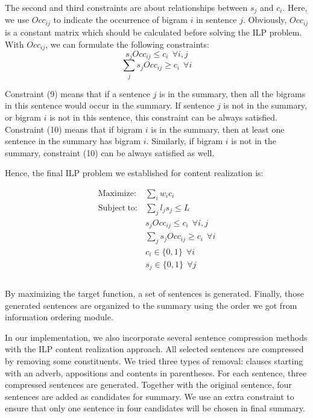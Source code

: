 \documentclass[11pt]{article}
\begin{document}
The second and third constraints are about relationships between $s_j$ and $c_i$. Here, we use $Occ_{ij}$ to indicate the occurrence of bigram $i$ in sentence $j$. Obviously, $Occ_{ij}$ is a constant matrix which should be calculated before solving the ILP problem. With $Occ_{ij}$, we can formulate the following constraints:
\begin{equation}
	s_jOcc_{ij} \leq c_i\ \  \forall i,j
\end{equation}
\begin{equation}
	\sum_j s_jOcc_{ij} \geq c_i\ \  \forall i
\end{equation}

Constraint (9) means that if a sentence $j$ is in the summary, then all the bigrams in this sentence would occur in the summary. If sentence $j$ is not in the summary, or bigram $i$ is not in this sentence, this constraint can be always satisfied. Constraint (10) means that if bigram $i$ is in the summary, then at least one sentence in the summary has bigram $i$. Similarly, if bigram $i$ is not in the summary, constraint (10) can be always satisfied as well.

Hence, the final ILP problem we established for content realization is:

\begin{equation}
	\begin{aligned}
	\mathrm{Maximize:} & \sum_i{w_ic_i} \\
	\mathrm{Subject\ to:} & \sum_j{l_js_j} \leq L \\
 	& s_jOcc_{ij} \leq c_i\ \ \forall i,j\\
	& \sum_j s_jOcc_{ij} \geq c_i\ \ \forall i \\
	& c_i \in \{0,1\}\ \ \forall i \\
	& s_j \in \{0,1\}\ \ \forall j \\
	\end{aligned}
\end{equation}
\\
\indent
By maximizing the target function, a set of sentences is generated. Finally, those generated sentences are organized to the summary using the order we got from information ordering module.

In our implementation, we also incorporate several sentence compression methods with the ILP content realization approach. All selected sentences are compressed by removing some constituents. We tried three types of removal: clauses starting with an adverb, appositions and contents in parentheses. For each sentence, three compressed sentences are generated. Together with the original sentence, four sentences are added as candidates for summary. We use an extra constraint to ensure that only one sentence in four candidates will be chosen in final summary. 
\end{document}
